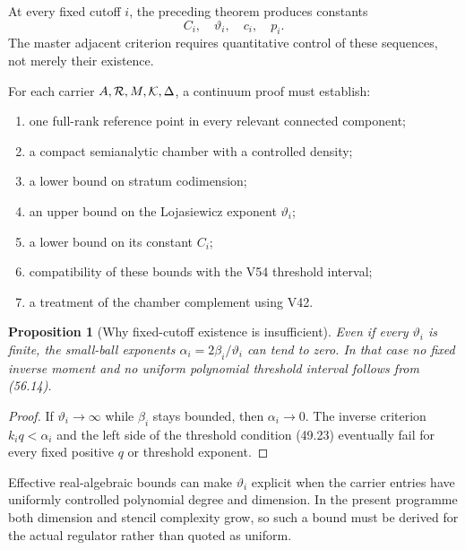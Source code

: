 \documentclass[11pt]{article}
\newtheorem{proposition}[theorem]{Proposition}
\begin{document}
At every fixed cutoff \(i\), the preceding theorem produces constants
\[
                    C_i,\quad\vartheta_i,\quad c_i,\quad p_i. \tag{56.17}
\]
The master adjacent criterion requires quantitative control of these
sequences, not merely their existence.

\begin{ledger}
\label{led:v11v56-uniform}
For each carrier \(A,{\cal R},M,{\cal K},\Delta\), a continuum proof
must establish:
\begin{enumerate}
\item one full-rank reference point in every relevant connected
component;
\item a compact semianalytic chamber with a controlled density;
\item a lower bound on stratum codimension;
\item an upper bound on the Lojasiewicz exponent \(\vartheta_i\);
\item a lower bound on its constant \(C_i\);
\item compatibility of these bounds with the V54 threshold interval;
\item a treatment of the chamber complement using V42.
\end{enumerate}
\end{ledger}

\begin{proposition}[Why fixed-cutoff existence is insufficient]
\label{prop:v11v56-nonuniform}
Even if every \(\vartheta_i\) is finite, the small-ball exponents
\(\alpha_i=2\beta_i/\vartheta_i\) can tend to zero.  In that case no
fixed inverse moment and no uniform polynomial threshold interval
follows from (56.14).
\end{proposition}

\begin{proof}
If \(\vartheta_i\to\infty\) while \(\beta_i\) stays bounded, then
\(\alpha_i\to0\).  The inverse criterion \(k_iq<\alpha_i\) and the
left side of the threshold condition (49.23) eventually fail for
every fixed positive \(q\) or threshold exponent.
\end{proof}

Effective real-algebraic bounds can make \(\vartheta_i\) explicit when
the carrier entries have uniformly controlled polynomial degree and
dimension.  In the present programme both dimension and stencil
complexity grow, so such a bound must be derived for the actual
regulator rather than quoted as uniform.
\end{document}
